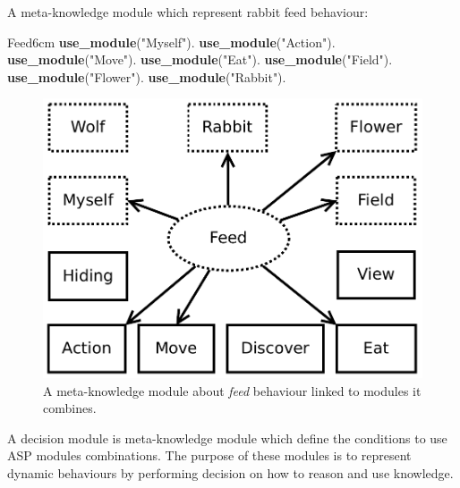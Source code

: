 \documentclass{aamas2012}
\begin{document}
	\begin{example}
		\label{feed_example}
		A meta-knowledge module which represent rabbit feed behaviour:\newline
		\begin{module}{Feed}{6cm}
			\textbf{use\_module}("Myself").\newline
			\textbf{use\_module}("Action").\newline
			\textbf{use\_module}("Move").\newline
			\textbf{use\_module}("Eat").\newline
			\textbf{use\_module}("Field").\newline
			\textbf{use\_module}("Flower").\newline
			\textbf{use\_module}("Rabbit").
		\end{module}
	\end{example}
	
	\begin{figure}
		\centering
		\includegraphics[keepaspectratio=true, scale=0.4]{feed.pdf}
		\caption
		{
			\label{feed_figure}
			A meta-knowledge module about \textit{feed} behaviour linked to modules it combines.
		}
	\end{figure}
	
	\begin{definition}
		A decision module is meta-knowledge module which define the conditions to use ASP modules combinations.	
		The purpose of these modules is to represent dynamic behaviours by performing decision on how to reason and use knowledge.
	\end{definition}
	
\end{document}
